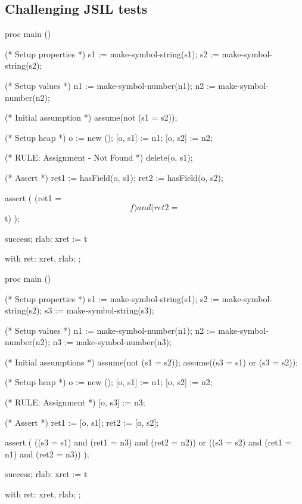 \subsection{Challenging JSIL tests}

\begin{lstjs}
proc main () {
    (* Setup properties *)
    s1 := make-symbol-string(s1);
    s2 := make-symbol-string(s2);

    (* Setup values *)
    n1 := make-symbol-number(n1);
    n2 := make-symbol-number(n2);

    (* Initial assumption *)
    assume(not (s1 = s2));

    (* Setup heap *)
    o := new ();
    [o, s1] := n1;
    [o, s2] := n2;

    (* RULE: Assignment - Not Found *)
    delete(o, s1);

    (* Assert *)
    ret1 := hasField(o, s1);
    ret2 := hasField(o, s2);

    assert (
        (ret1 = $$f) and (ret2 = $$t)
    );

    success;
    rlab:   xret := $$t
}
with
{
    ret:    xret, rlab;
};
\end{lstjs}

\begin{lstjs}
proc main () {
    (* Setup properties *)
    s1 := make-symbol-string(s1);
    s2 := make-symbol-string(s2);
    s3 := make-symbol-string(s3);

    (* Setup values *)
    n1 := make-symbol-number(n1);
    n2 := make-symbol-number(n2);
    n3 := make-symbol-number(n3);

    (* Initial assumptions *)
    assume(not (s1 = s2));
    assume((s3 = s1) or (s3 = s2));

    (* Setup heap *)
    o := new ();
    [o, s1] := n1;
    [o, s2] := n2;

    (* RULE: Assignment *)
    [o, s3] := n3;

    (* Assert *)
    ret1 := [o, s1];
    ret2 := [o, s2];

assert (
    ((s3 = s1) and (ret1 = n3) and (ret2 = n2)) or
    ((s3 = s2) and (ret1 = n1) and (ret2 = n3))
);

success;
    rlab:   xret := $$t
}
with
{
    ret:    xret, rlab;
};
\end{lstjs}
 
